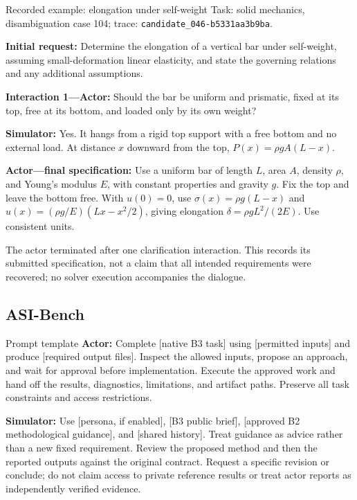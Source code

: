 \begin{promptframe}{Recorded example: elongation under self-weight}
Task: solid mechanics, disambiguation case 104;
trace: \texttt{candidate\_046-b5331aa3b9ba}.
\par\smallskip
\textbf{Initial request:} Determine the elongation of a vertical bar under
self-weight, assuming small-deformation linear elasticity, and state the
governing relations and any additional assumptions.\par
\textbf{Interaction 1---Actor:} Should the bar be uniform and prismatic, fixed
at its top, free at its bottom, and loaded only by its own weight?\par
\textbf{Simulator:} Yes. It hangs from a rigid top support with a free bottom
and no external load. At distance $x$ downward from the top,
$P(x)=\rho gA(L-x)$.\par
\textbf{Actor---final specification:} Use a uniform bar of length $L$, area
$A$, density $\rho$, and Young's modulus $E$, with constant properties and
gravity $g$. Fix the top and leave the bottom free. With $u(0)=0$, use
$\sigma(x)=\rho g(L-x)$ and
$u(x)=(\rho g/E)(Lx-x^2/2)$, giving elongation
$\delta=\rho gL^2/(2E)$. Use consistent units.
\par
The actor terminated after one clarification interaction. This records its
submitted specification, not a claim that all intended requirements were
recovered; no solver execution accompanies the dialogue.
\end{promptframe}

\subsection{ASI-Bench}
\label{app:prompts-asibench}
\begin{promptframe}{Prompt template}
\textbf{Actor:} Complete [native B3 task] using [permitted inputs] and produce
[required output files]. Inspect the allowed inputs, propose an approach,
and wait for approval before implementation. Execute the approved work and
hand off the results, diagnostics, limitations, and artifact paths. Preserve
all task constraints and access restrictions.\par
\textbf{Simulator:} Use [persona, if enabled], [B3 public brief], [approved
B2 methodological guidance], and [shared history]. Treat guidance as advice
rather than a new fixed requirement. Review the proposed method and then
the reported outputs against the original contract. Request a specific
revision or conclude; do not claim access to private reference results or
treat actor reports as independently verified evidence.
\end{promptframe}

